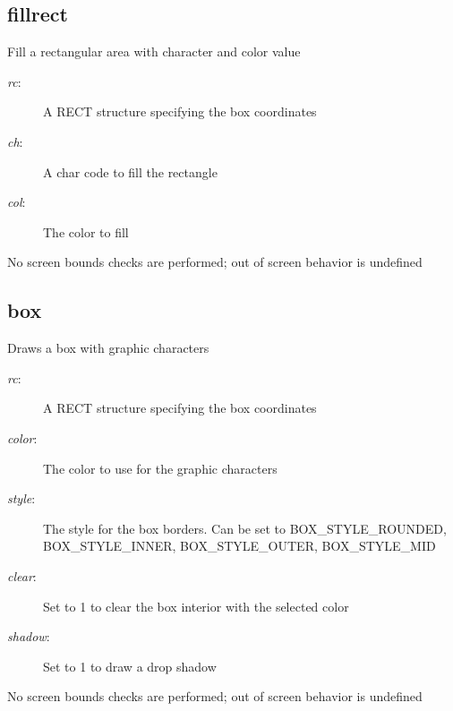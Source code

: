 \subsection{fillrect}
\begin{description}[leftmargin=2cm,style=nextline]
\item [Description:] {Fill a rectangular area with character and color value}
\item [Syntax:] 
\item [Parameters:]
\begin{description}\item[]
\item [{\em rc}:] {A RECT structure specifying the box coordinates}
\item [{\em ch}:] {A char code to fill the rectangle}
\item [{\em col}:] {The color to fill}
\end{description}
\item [Notes:] {No screen bounds checks are performed; out of screen behavior is undefined }
\end{description}

\subsection{box}
\begin{description}[leftmargin=2cm,style=nextline]
\item [Description:] {Draws a box with graphic characters}
\item [Syntax:] 
\item [Parameters:]
\begin{description}\item[]
\item [{\em rc}:] {A RECT structure specifying the box coordinates}
\item [{\em color}:] {The color to use for the graphic characters}
\item [{\em style}:] {The style for the box borders. Can be set to BOX\_STYLE\_ROUNDED, BOX\_STYLE\_INNER, BOX\_STYLE\_OUTER, BOX\_STYLE\_MID }
\item [{\em clear}:] {Set to 1 to clear the box interior with the selected color}
\item [{\em shadow}:] {Set to 1 to draw a drop shadow}
\end{description}
\item [Notes:] {No screen bounds checks are performed; out of screen behavior is undefined }
\end{description}


